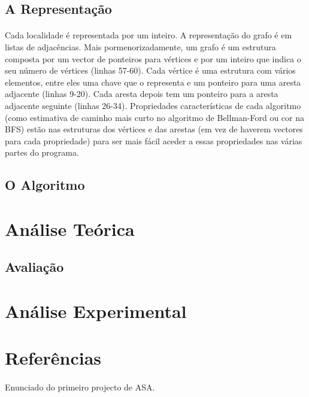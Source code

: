 \documentclass[12pt, a4paper]{article}
\begin{document}
\subsection{A Representação}
\paragraph{}
Cada localidade é representada por um inteiro. A representação do grafo é em
listas de adjacências. Mais pormenorizadamente, um grafo é um estrutura composta
por um vector de ponteiros para vértices e por um inteiro que indica o seu
número de vértices (linhas 57-60). Cada vértice é uma estrutura com vários
elementos, entre eles uma chave que o representa e um ponteiro para uma aresta
adjacente (linhas 9-20). Cada aresta depois tem um ponteiro para a aresta
adjacente seguinte (linhas 26-34). Propriedades características de cada
algoritmo (como estimativa de caminho mais curto no algoritmo de Bellman-Ford ou
cor na BFS) estão nas estruturas dos vértices e das arestas (em vez de haverem
vectores para cada propriedade) para ser mais fácil aceder a essas propriedades
nas várias partes do programa.

\subsection{O Algoritmo}
\paragraph{}

\section{Análise Teórica}
\subsection{Avaliação}
\paragraph{}

\section{Análise Experimental}
\paragraph{}

\section{Referências}
\paragraph{}
\indent[1] Enunciado do primeiro projecto de ASA.
\end{document}
